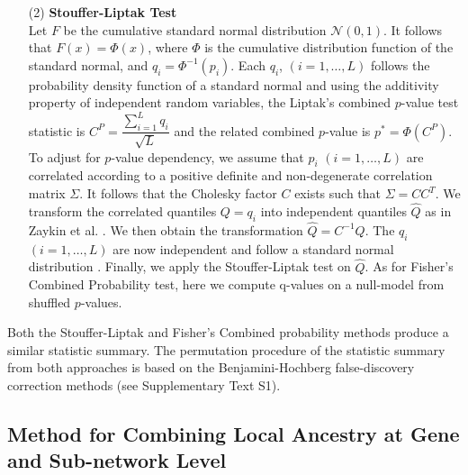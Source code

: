 \documentclass[10pt]{article}
\begin{document}
\begin{itemize}
\item [(2)]  \textbf{Stouffer-Liptak Test} \\

Let $F$ be the cumulative standard normal distribution $\mathcal{N}(0, 1)$. It follows that $F(x) = \Phi(x)$, where $\Phi$ is the cumulative distribution function of the standard normal, and $q_{i} = \Phi^{-1} (p_{i})$. Each $q_{i}$, $\left(i=1,\ldots,L\right)$ follows the probability density function of a standard normal and using the additivity property of independent random variables, the Liptak's combined $p$-value test statistic \cite{lipt} is $C^{P} = \dfrac{\sum_{i=1}^{L}q_{i}}{\sqrt{L}}$ and the related combined $p$-value is $p^{*} = \Phi(C^{P})$. To adjust for $p$-value dependency, we assume that $p_{i}$ $\left(i = 1,\ldots,L\right)$ are correlated according to a positive definite and non-degenerate correlation matrix $\Sigma$. It follows that the Cholesky factor $C$ exists such that $\Sigma = CC^{T}$. We transform the correlated quantiles $Q = {q_{i}}$ into independent quantiles $\hat Q$ as in Zaykin et al. \cite{Zayk}. We then obtain the transformation $\hat Q = C^{-1}Q$. The $q_{i}$ $\left(i =1,\ldots,L\right)$ are now independent and follow a standard normal distribution \cite{Zayk}. Finally, we apply the Stouffer-Liptak test on $\hat Q$. As for Fisher's Combined Probability test, here we compute q-values on a null-model from shuffled $p$-values.

\end{itemize}

Both the Stouffer-Liptak \cite{lipt} and Fisher's Combined probability \cite{fish,hess} methods produce a similar statistic summary. The permutation procedure of the statistic summary from both approaches is based on the Benjamini-Hochberg \cite{benj} false-discovery correction methods (see Supplementary Text S1).

\subsection*{Method for Combining Local Ancestry at Gene and Sub-network Level}
\end{document}
